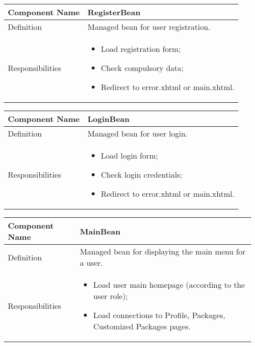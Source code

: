 \documentclass[a4paper,12pt]{book}
\begin{document}
\begin{center}
  \begin{tabular}{ | p{3.3cm} | p{11.7cm} | }
    \hline
    Component Name & \textbf{RegisterBean} \\ \hline
    Definition & Managed bean for user registration. \\ \hline
    Responsibilities & \parbox{0.65\textwidth}{
      \begin{itemize}[noitemsep,leftmargin=*]
        \item Load registration form;
        \item Check compulsory data;
        \item Redirect to error.xhtml or main.xhtml.
      \end{itemize}} \\ \hline
    \end{tabular}
  \end{center}
  \begin{center}
    \begin{tabular}{ | p{3.3cm} | p{11.7cm} | }
      \hline
      Component Name & \textbf{LoginBean} \\ \hline
      Definition & Managed bean for user login. \\ \hline
      Responsibilities & \parbox{0.65\textwidth}{
        \begin{itemize}[noitemsep,leftmargin=*]
          \item Load login form;
          \item Check login credentials;
          \item Redirect to error.xhtml or main.xhtml.
        \end{itemize}} \\ \hline
      \end{tabular}
    \end{center}
    \begin{center}
      \begin{tabular}{ | p{3.3cm} | p{11.7cm} | }
        \hline
        Component Name & \textbf{MainBean} \\ \hline
        Definition & Managed bean for displaying the main menu for a user. \\ \hline
        Responsibilities & \parbox{0.65\textwidth}{
          \begin{itemize}[noitemsep,leftmargin=*]
            \item Load user main homepage (according to the user role);
            \item Load connections to Profile, Packages, Customized Packages pages.
          \end{itemize}} \\ \hline
        \end{tabular}
      \end{center}
\end{document}
